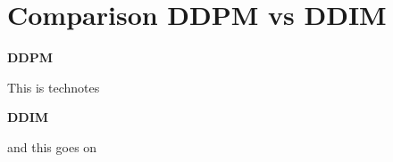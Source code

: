 \clearpage

\section{Comparison DDPM vs DDIM}\label{sec:ddpm_vs_ddim}

\begin{notebox}
\end{notebox}

\clearpage

\begin{paracol}{2}
\begin{center}
\LARGE \textbf{DDPM}
\end{center}

This is technotes
\switchcolumn
\begin{center}
\LARGE \textbf{DDIM}
\end{center}

and this goes on

\end{paracol}


